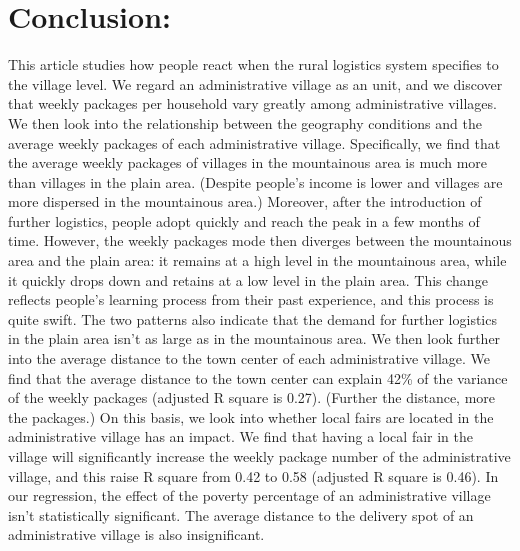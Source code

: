 \documentclass{article}
\begin{document}
\section{Conclusion:}
This article studies how people react when the rural logistics system specifies to the village level. We regard an administrative village as an unit, and we discover that weekly packages per household vary greatly among administrative villages. We then look into the relationship between the geography conditions and the average weekly packages of each administrative village. Specifically, we find that the average weekly packages of villages in the mountainous area is much more than villages in the plain area. (Despite people’s income is lower and villages are more dispersed in the mountainous area.) Moreover, after the introduction of further logistics, people adopt quickly and reach the peak in a few months of time. However, the weekly packages mode then diverges between the mountainous area and the plain area: it remains at a high level in the mountainous area, while it quickly drops down and retains at a low level in the plain area. This change reflects people’s learning process from their past experience, and this process is quite swift. The two patterns also indicate that the demand for further logistics in the plain area isn’t as large as in the mountainous area. We then look further into the average distance to the town center of each administrative village. We find that the average distance to the town center can explain 42\% of the variance of the weekly packages (adjusted R square is 0.27). (Further the distance, more the packages.) On this basis, we look into whether local fairs are located in the administrative village has an impact. We find that having a local fair in the village will significantly increase the weekly package number of the administrative village, and this raise R square from 0.42 to 0.58 (adjusted R square is 0.46). In our regression, the effect of the poverty percentage of an administrative village isn’t statistically significant. The average distance to the delivery spot of an administrative village is also insignificant.\\
\mbox{\hspace{2em}}
\end{document}
